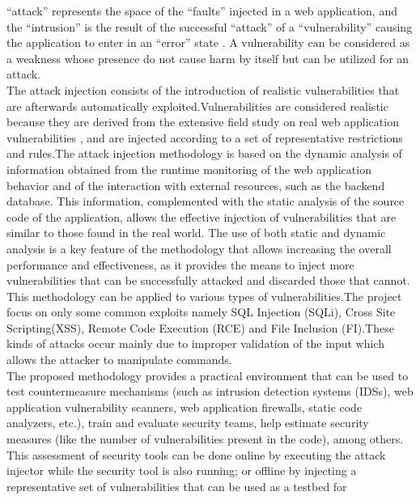 ``attack'' represents the space of the ``faults'' injected in a
web application, and the ``intrusion'' is the result of the
successful ``attack'' of a ``vulnerability'' causing the application to enter in an ``error'' state \cite{15}. A vulnerability can be considered as a weakness whose presence do not cause harm by itself but can be utilized for an attack. \\
\newline
 The attack injection consists of the introduction of realistic vulnerabilities that are afterwards
automatically exploited.Vulnerabilities are
considered realistic because they are derived from the
extensive field study on real web application vulnerabilities  \cite{16}, and are injected according to a set
of representative restrictions and rules.The attack injection methodology is based on the
dynamic analysis of information obtained from the runtime monitoring of the web application behavior and of
the interaction with external resources, such as the backend database. This information, complemented with the
static analysis of the source code of the application,
allows the effective injection of vulnerabilities that are
similar to those found in the real world. The
use of both static and dynamic analysis is a key feature
of the methodology that allows increasing the overall performance and effectiveness, as it provides the means to
inject more vulnerabilities that can be successfully
attacked and discarded those that cannot.\\
\newline
This methodology can be applied to various
types of vulnerabilities.The project focus on only some common exploits namely SQL Injection (SQLi), Cross Site Scripting(XSS), Remote Code Execution (RCE) and File Inclusion (FI).These kinds of attacks occur mainly due to improper validation of the input which allows the attacker to manipulate commands.\\
\newline
The proposed methodology provides a practical environment that can be used to test countermeasure mechanisms (such as intrusion detection systems (IDSs), web
application vulnerability scanners, web application firewalls, static code analyzers, etc.), train and evaluate security teams, help estimate security measures (like the
number of vulnerabilities present in the code), among
others. This assessment of security tools can be done
online by executing the attack injector while the security
tool is also running; or offline by injecting a representative set of vulnerabilities that can be used as a testbed for
